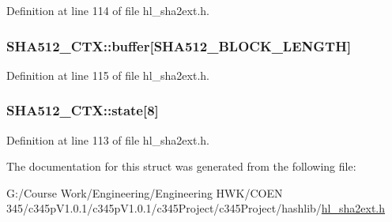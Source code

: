 Definition at line 114 of file hl\_\-sha2ext.h.\hypertarget{struct_s_h_a512___c_t_x_a26fa2e99b83bac3aa5afc37b4a4f3205}{
\subsubsection[{buffer}]{ {\bf SHA512\_\-CTX::buffer}\mbox{[}SHA512\_\-BLOCK\_\-LENGTH\mbox{]}}}
\label{struct_s_h_a512___c_t_x_a26fa2e99b83bac3aa5afc37b4a4f3205}


Definition at line 115 of file hl\_\-sha2ext.h.\hypertarget{struct_s_h_a512___c_t_x_a2d7d34b1abae336a931c9a9235dd92c4}{
\subsubsection[{state}]{ {\bf SHA512\_\-CTX::state}\mbox{[}8\mbox{]}}}
\label{struct_s_h_a512___c_t_x_a2d7d34b1abae336a931c9a9235dd92c4}


Definition at line 113 of file hl\_\-sha2ext.h.

The documentation for this struct was generated from the following file:\begin{DoxyCompactItemize}
\item 
G:/Course Work/Engineering/Engineering HWK/COEN 345/c345pV1.0.1/c345pV1.0.1/c345Project/c345Project/hashlib/\hyperlink{hl__sha2ext_8h}{hl\_\-sha2ext.h}\end{DoxyCompactItemize}
